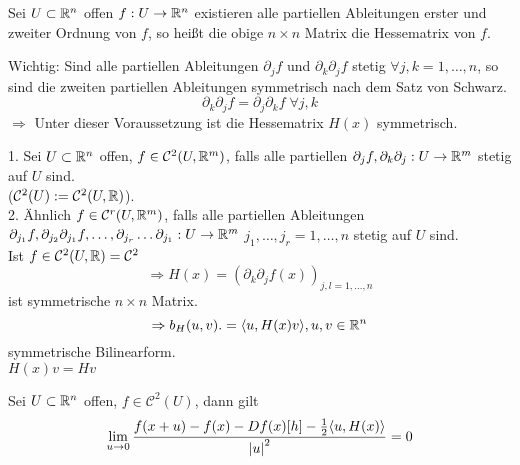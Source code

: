 \documentclass[../ana2.tex]{subfiles}
\begin{document}
\begin{defi}
    Sei \(U \subset \mathbb{R}^n\) offen \(f:U\rightarrow \mathbb{R}^n\) existieren alle partiellen Ableitungen
    erster und zweiter Ordnung von \(f\), so heißt die obige \(n\times n\) Matrix die Hessematrix 
    von \(f\).
\end{defi}
Wichtig: Sind alle partiellen Ableitungen \(\partial_j f\) und \( \partial_k \partial_j f \)
stetig \(\forall j,k = 1, \ldots , n\), so sind die zweiten partiellen Ableitungen symmetrisch
nach dem Satz von Schwarz.
\[ \partial_k \partial_j f = \partial_j \partial_k f \; \forall j,k \]
\(\Rightarrow\) Unter dieser Voraussetzung ist die Hessematrix \(H(x)\) symmetrisch.
\begin{defi}
    1. Sei \(U \subset \mathbb{R}^n\) offen, \(f \in \mathcal{C}^2(U, \mathbb{R}^m)\), falls alle
    partiellen \(\partial_jf, \partial_k \partial_j:U\rightarrow \mathbb{R}^m\) stetig auf \(U\) sind.\\
    (\( \mathcal{C}^2(U) := \mathcal{C}^2(U, \mathbb{R}) \)).\\
    2. Ähnlich \(f \in \mathcal{C}^r(U, \mathbb{R}^m)\), falls alle partiellen Ableitungen
    \( \partial_{j_1}f, \partial_{j_2}\partial_{j_1}f, \ldots, 
    \partial_{j_r}\ldots \partial_{j_1}:U\rightarrow \mathbb{R}^m \)
    \( j_1, \ldots, j_r = 1, \ldots, n \) stetig auf \(U\) sind.\\
    Ist \(f \in \mathcal{C}^2(U,\mathbb{R}) = \mathcal{C}^2\)
    \[ \Rightarrow H(x) = (\partial_k \partial_j f(x))_{j,l = 1,\ldots, n} \]
    ist symmetrische \(n\times n \) Matrix.
    \[ \Rightarrow b_H(u,v) .= \langle u, H(x)v \rangle, u,v \in \mathbb{R}^n \]
    symmetrische Bilinearform.\\
    \( H(x)v = H v \)
\end{defi}
\begin{lem}
    Sei \(U \subset \mathbb{R}^n\) offen, \(f \in \mathcal{C}^2(U)\), dann gilt
    \[ \lim\limits_{u\rightarrow{}0} \frac{f(x+u) - f(x) - Df(x)[h] - \frac{1}{2} \langle u, H(x) \rangle}
    {\left|u\right|^2} = 0 \]
\end{lem}
\end{document}
